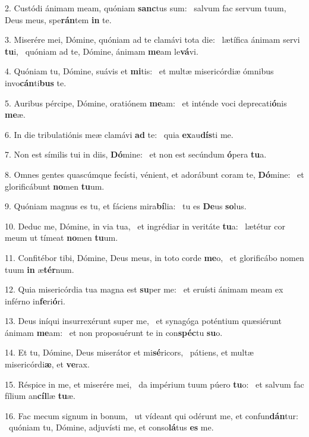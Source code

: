 2. Custódi ánimam meam, quóniam \textbf{sanc}tus sum: \ast\  salvum fac servum tuum, Deus meus, spe\textbf{rán}tem \textbf{in} te.\

3. Miserére mei, Dómine, quóniam ad te clamávi tota die: \dag\  lætífica ánimam servi \textbf{tu}i, \ast\  quóniam ad te, Dómine, ánimam \textbf{me}am le\textbf{vá}vi.\

4. Quóniam tu, Dómine, suávis et \textbf{mi}tis: \ast\  et multæ misericórdiæ ómnibus invo\textbf{cán}ti\textbf{bus} te.\

5. Auribus pércipe, Dómine, oratiónem \textbf{me}am: \ast\  et inténde voci deprecati\textbf{ó}nis \textbf{me}æ.\

6. In die tribulatiónis meæ clamávi \textbf{ad} te: \ast\  quia \textbf{ex}au\textbf{dís}ti me.\

7. Non est símilis tui in diis, \textbf{Dó}mine: \ast\  et non est secúndum \textbf{ó}pera \textbf{tu}a.\

8. Omnes gentes quascúmque fecísti, vénient, et adorábunt coram te, \textbf{Dó}mine: \ast\  et glorificábunt \textbf{no}men \textbf{tu}um.\

9. Quóniam magnus es tu, et fáciens mira\textbf{bí}lia: \ast\  tu es \textbf{De}us \textbf{so}lus.\

10. Deduc me, Dómine, in via tua, \dag\  et ingrédiar in veritáte \textbf{tu}a: \ast\  lætétur cor meum ut tímeat \textbf{no}men \textbf{tu}um.\

11. Confitébor tibi, Dómine, Deus meus, in toto corde \textbf{me}o, \ast\  et glorificábo nomen tuum \textbf{in} æ\textbf{tér}num.\

12. Quia misericórdia tua magna est \textbf{su}per me: \ast\  et eruísti ánimam meam ex inférno in\textbf{fe}ri\textbf{ó}ri.\

13. Deus iníqui insurrexérunt super me, \dag\  et synagóga poténtium quæsiérunt ánimam \textbf{me}am: \ast\  et non proposuérunt te in con\textbf{spéc}tu \textbf{su}o.\

14. Et tu, Dómine, Deus miserátor et mi\textbf{sé}ricors, \ast\  pátiens, et multæ misericórdi\textbf{æ}, et \textbf{ve}rax.\

15. Réspice in me, et miserére mei, \dag\  da impérium tuum púero \textbf{tu}o: \ast\  et salvum fac fílium an\textbf{cíl}læ \textbf{tu}æ.\

16. Fac mecum signum in bonum, \dag\  ut vídeant qui odérunt me, et confun\textbf{dán}tur: \ast\  quóniam tu, Dómine, adjuvísti me, et conso\textbf{lá}tus \textbf{es} me.\


